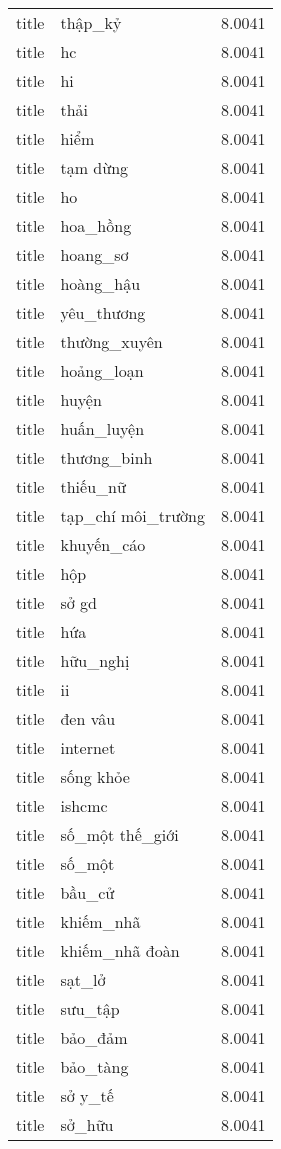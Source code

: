 \documentclass{article}
\begin{document}
\begin{tabular}{lll}
title & thập\_kỷ & 8.0041\\
title & hc & 8.0041\\
title & hi & 8.0041\\
title & thải & 8.0041\\
title & hiểm & 8.0041\\
title & tạm dừng & 8.0041\\
title & ho & 8.0041\\
title & hoa\_hồng & 8.0041\\
title & hoang\_sơ & 8.0041\\
title & hoàng\_hậu & 8.0041\\
title & yêu\_thương & 8.0041\\
title & thường\_xuyên & 8.0041\\
title & hoảng\_loạn & 8.0041\\
title & huyện & 8.0041\\
title & huấn\_luyện & 8.0041\\
title & thương\_binh & 8.0041\\
title & thiếu\_nữ & 8.0041\\
title & tạp\_chí môi\_trường & 8.0041\\
title & khuyến\_cáo & 8.0041\\
title & hộp & 8.0041\\
title & sở gd & 8.0041\\
title & hứa & 8.0041\\
title & hữu\_nghị & 8.0041\\
title & ii & 8.0041\\
title & đen vâu & 8.0041\\
title & internet & 8.0041\\
title & sống khỏe & 8.0041\\
title & ishcmc & 8.0041\\
title & số\_một thế\_giới & 8.0041\\
title & số\_một & 8.0041\\
title & bầu\_cử & 8.0041\\
title & khiếm\_nhã & 8.0041\\
title & khiếm\_nhã đoàn & 8.0041\\
title & sạt\_lở & 8.0041\\
title & sưu\_tập & 8.0041\\
title & bảo\_đảm & 8.0041\\
title & bảo\_tàng & 8.0041\\
title & sở y\_tế & 8.0041\\
title & sở\_hữu & 8.0041\\

\end{tabular}
\end{document}
